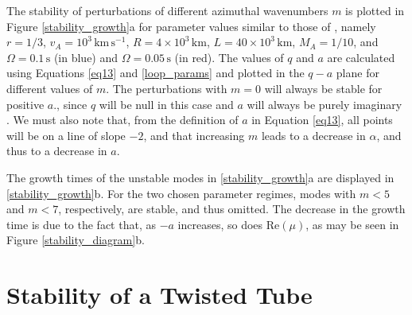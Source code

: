 \documentclass[12pt]{ociamthesis}
\begin{document}
The stability of perturbations of different azimuthal wavenumbers $m$ is plotted in Figure \ref{stability_growth}a for parameter values similar to those of \cite{Terradas2008}, namely $r = 1/3$, $v_A = 10^3 \, \mathrm{km}\, \mathrm{s}^{-1}$, $R = 4 \times 10^3 \, \mathrm{km}$, $L = 40 \times 10^3 \, \mathrm{km}$,  $M_A = 1/10$, and $\Omega = 0.1 \, \mathrm{s}$ (in blue) and $\Omega = 0.05 \, \mathrm{s}$ (in red).
The values of $q$ and $a$ are calculated using Equations \eqref{eq13} and \eqref{loop_params} and plotted in the $q-a$ plane for different values of $m$.
The perturbations with $m=0$ will always be stable for positive $a$., since $q$ will be null in this case and $a$ will always be purely imaginary \citep{McLachlan1946}.
We must also note that, from the definition of $a$ in Equation \eqref{eq13}, all points will be on a line of slope $-2$, and that increasing $m$ leads to a decrease in $\alpha$, and thus to a decrease in $a$.

The growth times of the unstable modes in \ref{stability_growth}a are displayed in \ref{stability_growth}b.
For the two chosen parameter regimes, modes with $m < 5$ and $m < 7$, respectively, are stable, and thus omitted.
The decrease in the growth time is due to the fact that, as $-a$ increases, so does $\mathrm{Re}(\mu)$, as may be seen in Figure \ref{stability_diagram}b.


\section{Stability of a Twisted Tube}
\label{inclined}

\begin{figure*}[t]
\centering
{}
\hfill
{}
\caption{Left: a schematic representation of a twisted magnetic tube embedded in a straight magnetic field. Right: a diagram of the flows on either side of the boundary during transverse oscillation.}
\label{stability_growth}
\end{figure*}

\begin{figure*}[t]
\centering
{}
\hspace{3pt}
\caption{The panel on the left represents $M_{A0}$ plotted for $\phi$ and $\theta$ in the range $(0, 2\pi)$. The dashed lines represent the values for which $M_{A0}$ is singular. The panel on the right displays the minimum value of $M_{A0}$, obtained from Equation \eqref{eq21}. Plotted for $r = 1/3$ and $\bar v_A^2 = r^{-1}$.}
\label{MA0}
\end{figure*}
\end{document}
